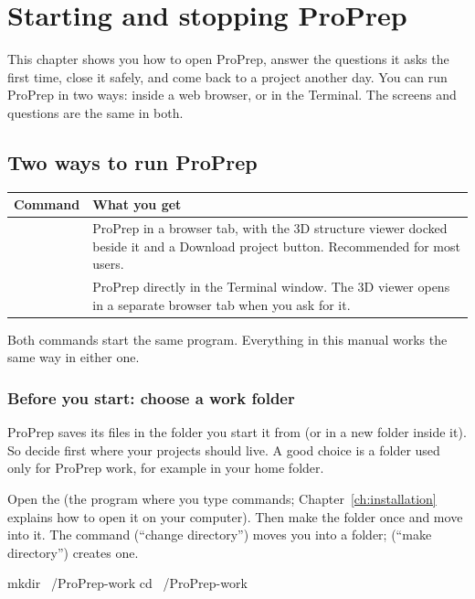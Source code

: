 \chapter{Starting and stopping ProPrep}\label{ch:starting}

This chapter shows you how to open ProPrep, answer the questions it asks the
first time, close it safely, and come back to a project another day. You can
run ProPrep in two ways: inside a web browser, or in the Terminal. The screens
and questions are the same in both.

\section{Two ways to run ProPrep}\label{sec:starting-twoways}

\begin{tabularx}{\linewidth}{@{}lL@{}}
\toprule
\textbf{Command} & \textbf{What you get} \\
\midrule
{} & ProPrep in a browser tab, with the 3D structure viewer
docked beside it and a \textsf{Download project} button. Recommended for most
users. \\
 & ProPrep directly in the Terminal window. The 3D viewer opens
in a separate browser tab when you ask for it. \\
\bottomrule
\end{tabularx}

\medskip
Both commands start the same program. Everything in this manual works the same
way in either one.

\subsection*{Before you start: choose a work folder}

ProPrep saves its files in the folder you start it from (or in a new folder
inside it). So decide first where your projects should live. A good choice is a
folder used only for ProPrep work, for example  in your home
folder.

Open the  (the program where you type commands; Chapter~\ref{ch:installation}
explains how to open it on your computer). Then make the folder once and move
into it. The command  (``change directory'') moves you into a folder;
 (``make directory'') creates one.

\begin{terminal}
mkdir ~/ProPrep-work
cd ~/ProPrep-work
\end{terminal}

